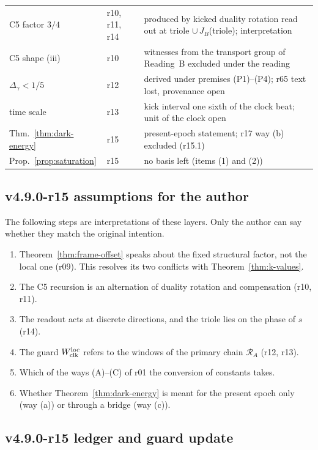 \begin{center}
\begin{tabular}{@{}>{\raggedright\arraybackslash}p{}>{\raggedright\arraybackslash}p{}>{\raggedright\arraybackslash}p{}@{}}
C5 factor \(3/4\) & r10, r11, r14 & produced by kicked duality rotation read out at triole \(\cup\,J_B\)(triole); interpretation\\
C5 shape (iii) & r10 & witnesses from the transport group of Reading~B excluded under the reading\\
\(\Delta_\gamma<1/5\) & r12 & derived under premises (P1)--(P4); r65 text lost, provenance open\\
time scale & r13 & kick interval one sixth of the clock beat; unit of the clock open\\
Thm.~\ref{thm:dark-energy} & r15 & present-epoch statement; r17 way (b) excluded (r15.1)\\
Prop.~\ref{prop:saturation} & r15 & no basis left (items (1) and (2))\\
\bottomrule
\end{tabular}
\end{center}

\subsection*{v4.9.0-r15 assumptions for the author}
\label{subsec:v490-r15-author}

The following steps are interpretations of these layers.  Only the author can say whether they match the original
intention.
\begin{enumerate}[leftmargin=2em]
\item Theorem~\ref{thm:frame-offset} speaks about the fixed structural factor, not the local one (r09).  This resolves its two
conflicts with Theorem~\ref{thm:k-values}.
\item The C5 recursion is an alternation of duality rotation and compensation (r10, r11).
\item The readout acts at discrete directions, and the triole lies on the phase of \(s\) (r14).
\item The guard \(W_{\rm clk}^{\rm loc}\) refers to the windows of the primary chain \(\mathcal R_A\) (r12, r13).
\item Which of the ways (A)--(C) of r01 the conversion of constants takes.
\item Whether Theorem~\ref{thm:dark-energy} is meant for the present epoch only (way (a)) or through a bridge (way (c)).
\end{enumerate}

\subsection*{v4.9.0-r15 ledger and guard update}
\label{subsec:v490-r15-ledger-guard}

